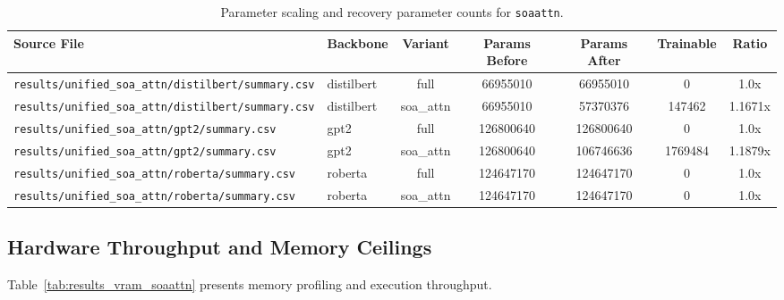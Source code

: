 \begin{table}[t]
\centering
\small
\begin{tabular}{llccccc}
\toprule
\textbf{Source File} & \textbf{Backbone} & \textbf{Variant} & \textbf{Params Before} & \textbf{Params After} & \textbf{Trainable} & \textbf{Ratio} \\
\midrule
\texttt{results/unified\_soa\_attn/distilbert/summary.csv} & distilbert & full & 66955010 & 66955010 & 0 & 1.0x \\
\texttt{results/unified\_soa\_attn/distilbert/summary.csv} & distilbert & soa\_attn & 66955010 & 57370376 & 147462 & 1.1671x \\
\texttt{results/unified\_soa\_attn/gpt2/summary.csv} & gpt2 & full & 126800640 & 126800640 & 0 & 1.0x \\
\texttt{results/unified\_soa\_attn/gpt2/summary.csv} & gpt2 & soa\_attn & 126800640 & 106746636 & 1769484 & 1.1879x \\
\texttt{results/unified\_soa\_attn/roberta/summary.csv} & roberta & full & 124647170 & 124647170 & 0 & 1.0x \\
\texttt{results/unified\_soa\_attn/roberta/summary.csv} & roberta & soa\_attn & 124647170 & 124647170 & 0 & 1.0x \\
\bottomrule
\end{tabular}
\caption{Parameter scaling and recovery parameter counts for \texttt{soaattn}.}
\label{tab:results_params_soaattn}
\end{table}

\subsection{Hardware Throughput and Memory Ceilings}
Table~\ref{tab:results_vram_soaattn} presents memory profiling and execution throughput.

